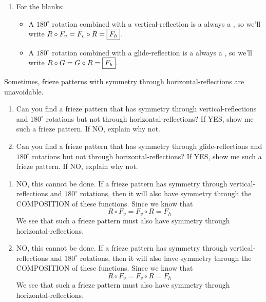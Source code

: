 \documentclass[noauthor,nooutcomes,hints        ]{ximera}
\begin{document}
\begin{question}
\begin{freeResponse}
\begin{enumerate}
\begin{center}
      \end{center}
    \item For the blanks:
      \begin{itemize}
      \item  A $180^\circ$ rotation combined with a vertical-reflection
        is a always a , so we'll
        write $R\circ F_v = F_v \circ R = \fbox{$F_h$}$.
      \item A $180^\circ$ rotation combined with a glide-reflection
        is a always a , so we'll
        write $R\circ G = G \circ R = \fbox{$F_h$}$.
      \end{itemize}
    \end{enumerate}
  \end{freeResponse}
\end{question}
\mynewpage








\begin{question}
  Sometimes, frieze patterns with symmetry through
  horizontal-reflections are unavoidable.
  \begin{enumerate}
  \item Can you find a frieze pattern that has symmetry through
    vertical-reflections and $180^\circ$ rotations but not through
    horizontal-reflections? If YES, show me such a frieze pattern. If
    NO, explain why not.    
  \item Can you find a frieze pattern that has symmetry through
    glide-reflections and $180^\circ$ rotations but not through
    horizontal-reflections? If YES, show me such a frieze pattern. If
    NO, explain why not.
  \end{enumerate}
  \begin{freeResponse}
    \begin{enumerate}
    \item NO, this cannot be done. If a frieze pattern has symmetry
      through vertical-reflections and $180^\circ$ rotations, then it
      will also have symmetry through the COMPOSITION of these
      functions. Since we know that
      \[
      R\circ F_v = F_v \circ R = F_h
      \]
      We see that such a frieze pattern must also have symmetry
      through horizontal-reflections.
    \item NO, this cannot be done.  If a frieze pattern has symmetry
      through vertical-reflections and $180^\circ$ rotations, then it
      will also have symmetry through the COMPOSITION of these
      functions. Since we know that
      \[
      R\circ F_v = F_v \circ R = F_h
      \]
      We see that such a frieze pattern must also have symmetry
      through horizontal-reflections.
    \end{enumerate}
  \end{freeResponse}
\end{question}
\end{document}
